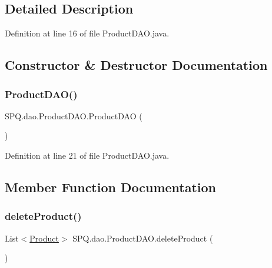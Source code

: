 \subsection{Detailed Description}


Definition at line 16 of file Product\+D\+A\+O.\+java.



\subsection{Constructor \& Destructor Documentation}
\mbox{\label{class_s_p_q_1_1dao_1_1_product_d_a_o_a16f6ce4efaca2c8d52d9af93d7cb6d1c}} 
\subsubsection{\texorpdfstring{Product\+D\+A\+O()}{ProductDAO()}}
{\footnotesize\ttfamily S\+P\+Q.\+dao.\+Product\+D\+A\+O.\+Product\+D\+AO (\begin{DoxyParamCaption}{ }\end{DoxyParamCaption})}



Definition at line 21 of file Product\+D\+A\+O.\+java.



\subsection{Member Function Documentation}
\mbox{\label{class_s_p_q_1_1dao_1_1_product_d_a_o_acdc252858b17b13fe9677aa1a455bef3}} 
\subsubsection{\texorpdfstring{delete\+Product()}{deleteProduct()}}
{\footnotesize\ttfamily List$<$\mbox{\hyperlink{class_s_p_q_1_1data_1_1_product}{Product}}$>$ S\+P\+Q.\+dao.\+Product\+D\+A\+O.\+delete\+Product (\begin{DoxyParamCaption}{ }\end{DoxyParamCaption})}



